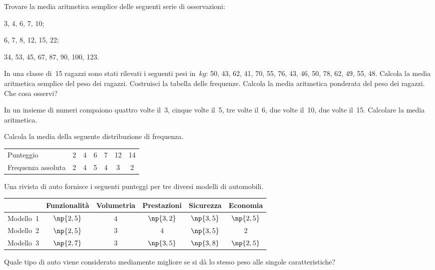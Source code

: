 \begin{esercizio}[\Ast]
\label{ese:A.24}
Trovare la media aritmetica semplice delle seguenti serie di osservazioni:
\begin{multicols}{2}
\begin{enumeratea}
 \item 3, 4, 6, 7, 10;
 \item 6, 7, 8, 12, 15, 22;
 \item 34, 53, 45, 67, 87, 90, 100, 123.
\end{enumeratea}
\end{multicols}
\end{esercizio}

\begin{esercizio}
\label{ese:A.25}
In una classe di~15 ragazzi sono stati rilevati i seguenti pesi in~$\unit{kg}$:
50, 43, 62, 41, 70, 55, 76, 43, 46, 50, 78, 62, 49, 55, 48.
Calcola la media aritmetica semplice del peso dei ragazzi. Costruisci la tabella delle frequenze.
Calcola la media aritmetica ponderata del peso dei ragazzi. Che cosa osservi?
\end{esercizio}

\begin{esercizio}[\Ast]
\label{ese:A.26}
In un insieme di numeri compaiono quattro volte il~3, cinque volte il~5, tre volte il~6, due volte il~10, due volte il~15. Calcolare la media aritmetica.
\end{esercizio}

\begin{esercizio}[\Ast]
\label{ese:A.27}
Calcola la media della seguente distribuzione di frequenza.
\begin{center}
 \begin{tabular}{l*{6}{c}}
\toprule
Punteggio & 2 & 4 & 6 & 7 & 12 & 14 \\
Frequenza assoluta & 2 & 4 & 5 & 4 & 3 & 2 \\
\bottomrule
\end{tabular}
\end{center}
\end{esercizio}

\begin{esercizio}
\label{ese:A.28}
Una rivista di auto fornisce i seguenti punteggi per tre diversi modelli di automobili.
\begin{center}
 \begin{tabular}{l*{5}{c}}
\toprule
 & Funzionalità & Volumetria & Prestazioni & Sicurezza & Economia \\
\midrule
Modello~1 & $\np{2,5}$ & $4$ & $\np{3,2}$ & $\np{3,5}$ & $\np{2,5}$ \\
Modello~2 & $\np{2,5}$ & $3$ & $4$ & $\np{3,5}$ & $2$ \\
Modello~3 & $\np{2,7}$ & $3$ & $\np{3,5}$ & $\np{3,8}$ & $\np{2,5}$ \\
\bottomrule
\end{tabular}
\end{center}
Quale tipo di auto viene considerato mediamente migliore se si dà lo stesso peso alle singole caratteristiche?
\end{esercizio}

